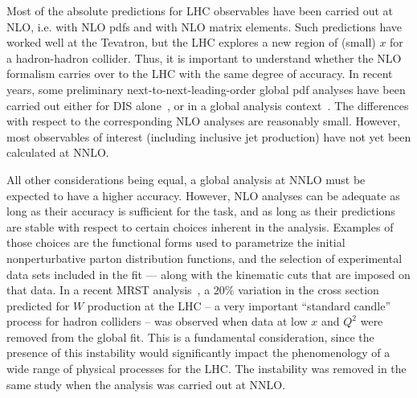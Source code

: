 \documentclass[12pt]{iopart}
\begin{document}
Most of the absolute predictions for LHC observables have been carried out at  NLO, i.e. with NLO pdfs and with
NLO matrix elements. Such predictions have worked well  at the Tevatron, but the LHC explores a new region of
(small) $x$ for  a hadron-hadron collider. Thus, it is important to understand whether the NLO  formalism carries over
to  the LHC with the same degree of accuracy.  In recent years, some preliminary next-to-next-leading-order
global pdf analyses have been carried out either for DIS alone~\cite{Alekhin}, or in a global analysis
context~\cite{mrstnnlo}. The differences with respect to the corresponding NLO analyses are reasonably small.
However, most observables of interest (including  inclusive jet production) have not yet been calculated at
NNLO.  

All other considerations being equal, a global analysis at NNLO must be expected to have a higher accuracy.
However, NLO analyses can be adequate as long as their accuracy is sufficient for the task, and as long as their
predictions are stable with respect to certain choices inherent in the analysis. Examples of those choices are
the functional forms used to parametrize the initial nonperturbative parton distribution functions, and the
selection of experimental data sets included in the fit --- along with the kinematic cuts that are imposed on that
data. In a recent MRST analysis~\cite{Martin:2003sk}, a $20\%$ variation in the cross section predicted for $W$
production at the LHC -- a very important ``standard candle'' process for hadron colliders -- was observed when
data at low $x$ and $Q^2$ were removed from the global fit. This is a fundamental consideration, since the
presence of this instability would significantly impact the phenomenology of a wide range of physical processes
for the LHC. The instability was removed in the same study when the analysis was carried out at NNLO. 
\end{document}
